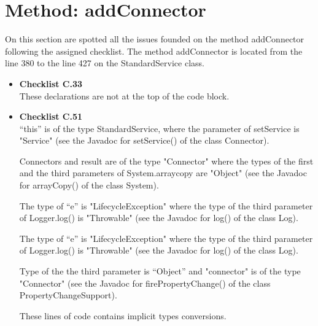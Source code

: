 \documentclass[../../../../codeInspection.tex]{subfiles}
\begin{document}
	\section{Method: addConnector}

		On this section are spotted all the issues founded on the method addConnector following the assigned checklist.
		The method addConnector is located from the line 380 to the line 427 on the StandardService class.

		\begin{itemize}
			\item \textbf{Checklist C.33} \\

				  

				  These declarations are not at the top of the code block.

			\item \textbf{Checklist C.51} \\

				  

				  “this” is of the type StandardService, where the parameter of setService is "Service"
				  (see the Javadoc for setService() of the class Connector).

				  

				  Connectors and result are of the type "Connector" where the types of the first and the third parameters of System.arraycopy are "Object" (see the Javadoc for arrayCopy() of the class System).

				  

				  The type of “e” is "LifecycleException" where the type of the third parameter of Logger.log() is "Throwable" (see the Javadoc for log() of the class Log).

				  

				  The type of “e” is "LifecycleException" where the type of the third parameter of Logger.log() is "Throwable" (see the Javadoc for log() of the class Log).

				  

				  Type of the the third parameter is “Object” and "connector" is of the type "Connector" (see the Javadoc for firePropertyChange() of the class PropertyChangeSupport).

				  These lines of code contains implicit types conversions.

		\end{itemize}
\end{document}
